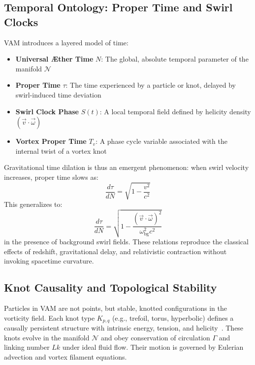 \documentclass[12pt]{article}
\begin{document}
    \subsection{Temporal Ontology: Proper Time and Swirl Clocks}

    VAM introduces a layered model of time:
    \begin{itemize}
        \item \textbf{Universal Æther Time} $N$: The global, absolute temporal parameter of the manifold $\mathcal{N}$
        \item \textbf{Proper Time} $\tau$: The time experienced by a particle or knot, delayed by swirl-induced time deviation
        \item \textbf{Swirl Clock Phase} $S(t)$: A local temporal field defined by helicity density $(\vec{v} \cdot \vec{\omega})$
        \item \textbf{Vortex Proper Time} $T_v$: A phase cycle variable associated with the internal twist of a vortex knot
    \end{itemize}

    Gravitational time dilation is thus an emergent phenomenon: when swirl velocity increases, proper time slows as:
    \begin{equation}
        \frac{d\tau}{dN} = \sqrt{1 - \frac{v^2}{c^2}}
        \label{eq:basic_time_deviation}
    \end{equation}
    This generalizes to:
    \begin{equation}
        \frac{d\tau}{dN} = \sqrt{1 - \frac{(\vec{v} \cdot \vec{\omega})^2}{\omega_{\text{bg}}^2 c^2}}
        \label{eq:helicity_time_deviation}
    \end{equation}
    in the presence of background swirl fields. These relations reproduce the classical effects of redshift, gravitational delay, and relativistic contraction without invoking spacetime curvature.

    \subsection{Knot Causality and Topological Stability}

    Particles in VAM are not points, but stable, knotted configurations in the vorticity field. Each knot type $K_{p,q}$ (e.g., trefoil, torus, hyperbolic) defines a causally persistent structure with intrinsic energy, tension, and helicity~\cite{moffatt1969degree, arnold1998topological}. These knots evolve in the manifold $\mathcal{N}$ and obey conservation of circulation $\Gamma$ and linking number $Lk$ under ideal fluid flow. Their motion is governed by Eulerian advection and vortex filament equations.
\end{document}
